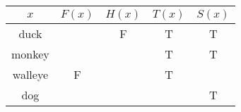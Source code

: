 \begin{questions}
\begin{enumerate}[label=(\alph*)]
  \hspace*{0.5in}\begin{tabular}{|c|c|c|c|c|}
    \hline
      $x$ & $F(x)$ & $H(x)$ & $T(x)$ & \hspace*{0.1in}$S(x)$ \hspace*{0.1in}\\
    \hline
      duck  &  & F & T & T \\
    \hline  
      monkey &  & & T & T \\
    \hline 
      walleye & F &  & T &  \\
    \hline
      dog   & \hspace*{0.5in}  & & & T \\
    \hline
  \end{tabular}
\fi


\end{enumerate}
\end{questions}
